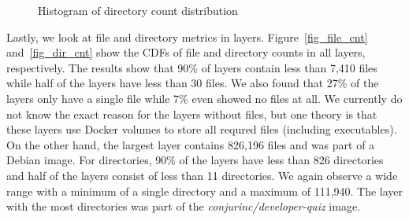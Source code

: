 \begin{figure}[!t]
	\centering
	\caption{Histogram of directory count distribution}
	\label{fig:reference-cnt}
\end{figure}

Lastly, we look at file and directory metrics in layers.
Figure~\ref{fig_file_cnt} and~\ref{fig_dir_cnt} show the CDFs of file and
directory counts in all layers, respectively.
%
The results show that 90\% of layers contain less than 7,410 files while half
of the layers have less than 30 files.
%
We also found that 27\% of the layers only have a single file while 7\% even
showed no files at all. We currently do not know the exact reason for the
layers without files, but one theory is that these layers use Docker volumes to
store all requred files (including executables).
On the other hand, the largest layer contains 826,196 files and was part of a
Debian image.
%
%
For directories, 90\% of the layers have less than 826 directories and half of
the layers consist of less than 11 directories. We again observe a wide range
with a minimum of a single directory and a maximum of 111,940. The layer with
the most directories was part of the \textit{conjurinc/developer-quiz} image.


